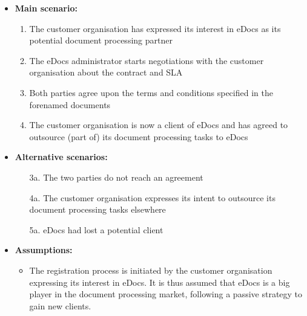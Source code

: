 \documentclass[a4paper,10pt]{article}
\begin{document}
\begin{itemize}
    \item \textbf{Main scenario:} 
    \begin{enumerate}
       \item The customer organisation has expressed its interest in eDocs as its potential document processing partner
       \item The eDocs administrator starts negotiations with the customer organisation about the contract and SLA
       \item Both parties agree upon the terms and conditions specified in the forenamed documents
       \item The customer organisation is now a client of eDocs and has agreed to outsource (part of) its document processing tasks to eDocs
    \end{enumerate}
    \item \textbf{Alternative scenarios:} 
    \begin{enumerate}
        \item [3a.] The two parties do not reach an agreement
        \item [4a.] The customer organisation expresses its intent to outsource its document processing tasks elsewhere
        \item [5a.] eDocs had lost a potential client
    \end{enumerate}
    
    \item \textbf{Assumptions:}
        \begin{itemize}
            \item The registration process is initiated by the customer organisation expressing its interest in eDocs. It is thus assumed that eDocs is a big player in the document processing market, following a passive strategy to gain new clients.
        \end{itemize}
\end{itemize}
\end{document}
